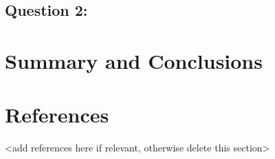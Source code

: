 \documentclass[
  12pt,
]{article}
\begin{document}
\hypertarget{question-2}{%
\subsection{Question 2:}\label{question-2}}

\newpage

\hypertarget{summary-and-conclusions}{%
\section{Summary and Conclusions}\label{summary-and-conclusions}}

\newpage

\hypertarget{references}{%
\section{References}\label{references}}

\textless add references here if relevant, otherwise delete this
section\textgreater{}
\end{document}
